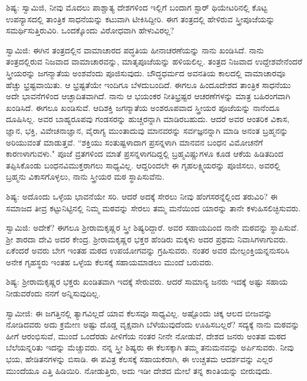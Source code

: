 ಶಿಷ್ಯ: ಸ್ವಾಮಿಜಿ, ನೀವು ಮೊದಲು ಪಾಶ್ಚಾತ್ಯ ದೇಶಗಳಿಂದ ಇಲ್ಲಿಗೆ ಬಂದಾಗ ಸ್ಟಾರ್ ಥಿಯೇಟರಿನಲ್ಲಿ ಕೊಟ್ಟ ಉಪನ್ಯಾಸದಲ್ಲಿ ತಾಂತ್ರಿಕ ಸಾಧನೆಯನ್ನು ಕಟುವಾಗಿ ಟೀಕಿಸಿದ್ದೀರಿ. ಈಗ ತಂತ್ರದಲ್ಲಿ ಹೇಳಿರುವ ಸ್ತ್ರೀಪೂಜೆಯನ್ನು ಸಮರ್ಥಿಸುತ್ತಿರುವಿರಿ. ಒಂದಕ್ಕೊಂದು ವಿರೋಧವಾಗಿ ಹೇಳುವಿರಲ್ಲ?

ಸ್ವಾಮಿಜಿ: ಈಗಿನ ತಂತ್ರದಲ್ಲಿನ ವಾಮಾಚಾರದ ಪದ್ಧತಿಯ ಹೀನಾಚರಣೆಯನ್ನು ನಾನು ಖಂಡಿಸಿದೆ. ನಾನು ತಂತ್ರದಲ್ಲಿರುವ ನಿಜವಾದ ವಾಮಾಚಾರವನ್ನು, ಮಾತೃಪೂಜೆಯನ್ನು ಹಳಿಯಲಿಲ್ಲ. ತಂತ್ರದ ನಿಜವಾದ ಉದ್ದೇಶವೇನೆಂದರೆ ಸ್ತ್ರೀಯರನ್ನು ಜಗನ್ಮಾತೆಯ ಅಂಶವೆಂದು ಪೂಜಿಸುವುದು. ಬೌದ್ಧಧರ್ಮದ ಅವನತಿಯ ಕಾಲದಲ್ಲಿ ವಾಮಾಚಾರವೂ ಹೆಚ್ಚು ಭ್ರಷ್ಟವಾಯಿತು. ಆ ಭ್ರಷ್ಟತೆಯೇ ಇಂದಿಗೂ ಬೆಳದುಬಂದಿದೆ. ಈಗಲೂ ಹಿಂದೂದೇಶದ ತಾಂತ್ರಿಕ ಸಾಧನೆಯು ಅದೇ ಭಾವನೆಗಳಿಂದ ಆಚ್ಛಾದಿತವಾಗಿದೆ. ನಾನು ಆ ಭಯಂಕರ ನೀತಿಭ್ರಷ್ಟರ ಆಚರಣೆಗಳನ್ನು ಮಾತ್ರ ಬಹಿರಂಗವಾಗಿ ಖಂಡಿಸಿದೆ. ಈಗಲೂ ಖಂಡಿಸುವೆ. ಆದಿಶಕ್ತಿ ಜಗನ್ಮಾತೆಯ ಅಂಶರೂಪವಾದ ಸ್ತ್ರೀಯರ ಪೂಜೆಯನ್ನು ನಾನೆಂದೂ ದೂಷಿಸಿಲ್ಲ. ಅವರ ಬಾಹ್ಯರೂಪವು ಗಂಡಸರನ್ನು ಹುಚ್ಚರನ್ನಾಗಿ ಮಾಡಿರಬಹುದು. ಆದರೆ ಅವರ ಆಂತರಿಕ ವಿಕಾಸ, ಜ್ಞಾನ, ಭಕ್ತಿ, ವಿವೇಚನಾಜ್ಞಾನ, ವೈರಾಗ್ಯ ಮುಂತಾದುವು ಮಾನವರನ್ನು ಸರ್ವಜ್ಞನನ್ನಾಗಿ ಮಾಡಿ ಅನಂತ ಬ್ರಹ್ಮನನ್ನು ಅರಿಯುವಂತೆ ಮಾಡುತ್ತವೆ. “ಶಕ್ತಿಯು ಸಂತುಷ್ಟಳಾದಾಗ ಪ್ರಸನ್ನಳಾಗಿ ಮಾನವನ ಬಂಧನ ವಿಮೋಚನೆಗೆ ಕಾರಣಳಾಗುವಳು." ಪೂಜೆ ವ್ರತಗಳಿಂದ ಮಾತೆ ಪ್ರಸನ್ನಳಾಗದಿದ್ದಲ್ಲಿ ಬ್ರಹ್ಮವಿಷ್ಣುಗಳೂ ಕೂಡ ಆಕೆಯ ಹಿಡಿತದಿಂದ ತಪ್ಪಿಸಿಕೊಂಡು ಬಂಧನವಿಮುಕ್ತರಾಗಲು ಸಾಧ್ಯವಿಲ್ಲ. ಆದ್ದರಿಂದಲೇ ಈ ಗೃಹಲಕ್ಷ್ಮಿಯರನ್ನು ಪೂಜಿಸಲು, ಅವರಲ್ಲಿ ಬ್ರಹ್ಮನು ವಿಕಾಸಗೊಳ್ಳಲು, ನಾನು ಸ್ತ್ರೀಯರ ಮಠ ಸ್ಥಾಪಿಸುವೆನು.

ಶಿಷ್ಯ: ಅದೊಂದು ಒಳ್ಳೆಯ ಭಾವನೆಯೇ ಸರಿ. ಆದರೆ ಅದಕ್ಕೆ ಸೇರಲು ನೀವು ಹೆಂಗಸರನ್ನೆಲ್ಲಿಂದ ತರುವಿರಿ? ಈ ಸಮಾಜದ ತೀವ್ರ ಕಟ್ಟುನಿಟ್ಟಿನಲ್ಲಿ ನಿಮ್ಮ ಮಠವನ್ನು ಸೇರಲು ತಮ್ಮ ಮನೆಯಿಂದ ಯಾರನ್ನು ತಾನೇ ಕಳುಹಿಸಲಿಚ್ಛಿಸುವರು.

ಸ್ವಾಮಿಜಿ: ಅದೇಕೆ? ಈಗಲೂ ಶ‍್ರೀರಾಮಕೃಷ್ಣರ ಸ್ತ್ರೀ ಶಿಷ್ಯರಿದ್ದಾರೆ. ಅವರ ಸಹಾಯದಿಂದ ನಾನೇ ಮಠವನ್ನು ಸ್ಥಾಪಿಸುವೆ. ಶ‍್ರೀ ಶಾರದಾ ದೇವಿ ಅದರ ಕೇಂದ್ರ. ಶ‍್ರೀರಾಮಕೃಷ್ಣರ ಭಕ್ತರ ಹೆಂಡಿರು ಮಕ್ಕಳು ಅದರ ಪ್ರಥಮ ನಿವಾಸಿಗಳಾಗುವರು. ಏಕೆಂದರೆ ಅವರು ಬೇಗ ಇಂತಹ ಮಠದ ಉಪಯೋಗವನ್ನು ಗ್ರಹಿಸುವರು. ನಂತರ ಅವರ ಮೇಲ್ಪಂಕ್ತಿಯನ್ನನುಸರಿಸಿ ಅನೇಕ ಗೃಹಸ್ಥರು ಇಂತಹ ಒಳ್ಳೆಯ ಕೆಲಸಕ್ಕೆ ಸಹಾಯಮಾಡಲು ಮುಂದೆ ಬರುವರು.

ಶಿಷ್ಯ: ಶ‍್ರೀರಾಮಕೃಷ್ಣರ ಭಕ್ತರು ಖಂಡಿತವಾಗಿ ಇದಕ್ಕೆ ಸೇರುವರು. ಆದರೆ ಸಾಮಾನ್ಯ ಜನರು ಇದಕ್ಕೆ ಅಷ್ಟು ಸಹಾಯ ನೀಡುವರೆಂದು ನನಗೆ ಅನ್ನಿಸುವುದಿಲ್ಲ.

ಸ್ವಾಮೀಜಿ: ಈ ಜಗತ್ತಿನಲ್ಲಿ ತ್ಯಾಗವಿಲ್ಲದೆ ಯಾವ ಕೆಲಸವೂ ಸಾಧ್ಯವಿಲ್ಲ. ಅಷ್ಟೊಂದು ಚಿಕ್ಕ ಆಲದ ಬೀಜವನ್ನು ನೋಡಿದವರು ಅದು ಕ್ರಮೇಣ ಅಷ್ಟು ದೊಡ್ಡ ವೃಕ್ಷವಾಗಿ ಬೆಳೆಯುವುದೆಂದು ಊಹಿಸಬಲ್ಲರೆ? ಸದ್ಯಕ್ಕೆ ನಾನು ಮಠವನ್ನು ಹೀಗೆ ಆರಂಭಿಸುವೆ, ಮುಂದೆ ಒಂದೆರಡು ಪೀಳಿಗೆಯ ನಂತರ ನೀನೇ ನೋಡುವೆ, ದೇಶದ ಜನರು ಅಂತಹ ಮಠದ ಬೆಲೆಯನ್ನರಿತು ಇದನ್ನು ಮೆಚ್ಚುವರು. ನನ್ನ ಸ್ತ್ರೀ ಶಿಷ್ಯರು ಈ ಕೆಲಸಕ್ಕಾಗಿ ತಮ್ಮ ತನುಮನವನ್ನು ಅರ್ಪಿಸುವರು. ನೀವು ಭಯ, ಹೇಡಿತನಗಳನ್ನು ಬಿಸಾಡಿ. ಈ ಪವಿತ್ರ ಕೆಲಸಕ್ಕೆ ಸಹಾಯಕರಾಗಿ, ಈ ಉಚ್ಚತಮ ಆದರ್ಶವನ್ನು ಎಲ್ಲರ ಮುಂದೆಯೂ ಎತ್ತಿ ಹಿಡಿಯಿರಿ. ನೋಡುತ್ತಿರು, ಅದು ಇಡೀ ದೇಶದ ಮೇಲೆ ತನ್ನ ಕಾಂತಿಯನ್ನು ಬೀರುವುದು.

